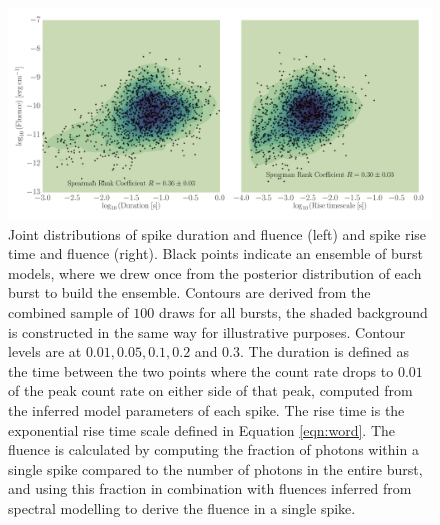 \documentclass[12pt]{emulateapj}
\begin{document}
\begin{figure}[htbp]
\begin{center}
\includegraphics[width=\textwidth]{ch6f7.pdf}%
\caption{Joint distributions of spike duration and fluence (left) and spike rise time and fluence (right). Black points indicate an ensemble of burst models, where we drew once
from the posterior distribution of each burst to build the ensemble. Contours are derived from the combined sample of $100$ draws for all bursts, the shaded background is constructed in
the same way for illustrative purposes. Contour levels are at $0.01, 0.05, 0.1, 0.2$ and $0.3$.
The duration is defined as the time between the two points where
the count rate drops to $0.01$ of the peak count rate on either side of that peak, computed from the inferred model parameters of each spike. The rise time is the exponential
rise time scale defined in Equation \ref{eqn:word}. The fluence is calculated by computing the fraction of photons within a single spike compared to the number of photons in the
entire burst, and using
this fraction in combination with fluences inferred from spectral modelling \citep{vanderhorst2012,vonkienlin2012} to derive the fluence in a single spike.}
\label{fig:correlations}
\end{center}
\end{figure}
\end{document}
